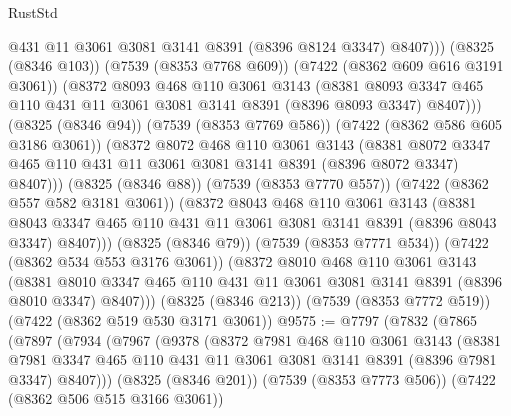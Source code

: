\begin{lexlean}{RustStd}
\begin{coremodule}
                  @431
                  @11
                  @3061
                  @3081
                  @3141
                  @8391
                  (@8396 @8124 @3347)
                  @8407)))
            (@8325 (@8346 @103))
            (@7539 (@8353 @7768 @609))
            (@7422 (@8362 @609 @616 @3191 @3061))
            (@8372
              @8093
              @468
              @110
              @3061
              @3143
              (@8381
                @8093
                @3347
                @465
                @110
                @431
                @11
                @3061
                @3081
                @3141
                @8391
                (@8396 @8093 @3347)
                @8407)))
          (@8325 (@8346 @94))
          (@7539 (@8353 @7769 @586))
          (@7422 (@8362 @586 @605 @3186 @3061))
          (@8372
            @8072
            @468
            @110
            @3061
            @3143
            (@8381
              @8072
              @3347
              @465
              @110
              @431
              @11
              @3061
              @3081
              @3141
              @8391
              (@8396 @8072 @3347)
              @8407)))
        (@8325 (@8346 @88))
        (@7539 (@8353 @7770 @557))
        (@7422 (@8362 @557 @582 @3181 @3061))
        (@8372
          @8043
          @468
          @110
          @3061
          @3143
          (@8381 @8043 @3347 @465 @110 @431 @11 @3061 @3081 @3141 @8391 (@8396 @8043 @3347) @8407)))
      (@8325 (@8346 @79))
      (@7539 (@8353 @7771 @534))
      (@7422 (@8362 @534 @553 @3176 @3061))
      (@8372
        @8010
        @468
        @110
        @3061
        @3143
        (@8381 @8010 @3347 @465 @110 @431 @11 @3061 @3081 @3141 @8391 (@8396 @8010 @3347) @8407)))
    (@8325 (@8346 @213))
    (@7539 (@8353 @7772 @519))
    (@7422 (@8362 @519 @530 @3171 @3061))
@9575 := @7797
    (@7832
      (@7865
        (@7897
          (@7934
            (@7967
              (@9378
                (@8372
                  @7981
                  @468
                  @110
                  @3061
                  @3143
                  (@8381
                    @7981
                    @3347
                    @465
                    @110
                    @431
                    @11
                    @3061
                    @3081
                    @3141
                    @8391
                    (@8396 @7981 @3347)
                    @8407)))
              (@8325 (@8346 @201))
              (@7539 (@8353 @7773 @506))
              (@7422 (@8362 @506 @515 @3166 @3061))

\end{coremodule}
\end{lexlean}
